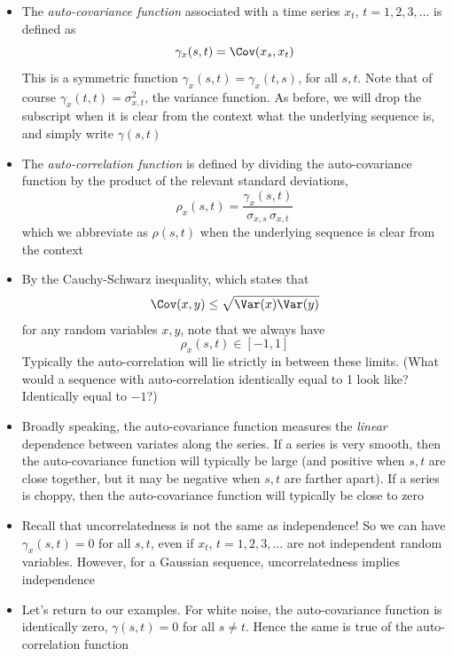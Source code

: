 \documentclass{article}
\begin{document}
\begin{itemize}
\item The \emph{auto-covariance function} associated with a time series $x_t$,
  $t = 1,2,3,\dots$ is defined as
  \[
  \gamma_x(s,t) = \Cov(x_s, x_t)
  \]
  This is a symmetric function $\gamma_x(s,t) = \gamma_x(t,s)$, for all $s,t$.
  Note that of course $\gamma_x(t,t) = \sigma^2_{x,t}$, the variance
  function. As before, we will drop the subscript when it is clear from the
  context what the underlying sequence is, and simply write $\gamma(s,t)$  

\item The \emph{auto-correlation function} is defined by dividing the
  auto-covariance function by the product of the relevant standard deviations, 
  \[
  \rho_x(s,t) = \frac{\gamma_x(s,t)}{\sigma_{x,s} \, \sigma_{x,t}}
  \]
  which we abbreviate as $\rho(s,t)$ when the underlying sequence is clear from
  the context 

\item By the Cauchy-Schwarz inequality, which states that
  \[
  \Cov(x, y) \leq \sqrt{\Var(x) \Var(y)}
  \]
  for any random variables $x,y$, note that we always have
  \[
  \rho_x(s,t) \in [-1, 1]
  \]
  Typically the auto-correlation will lie strictly in between these limits. 
  (What would a sequence with auto-correlation identically equal to 1 look like?  
  Identically equal to $-1$?) 

\item Broadly speaking, the auto-covariance function measures the \emph{linear}
  dependence between variates along the series. If a series is very smooth, then
  the auto-covariance function will typically be large (and positive when $s,t$
  are close together, but it may be negative when $s,t$ are farther apart). If a 
  series is choppy, then the auto-covariance function will typically be close to
  zero 

\item Recall that uncorrelatedness is not the same as independence! So we can
  have $\gamma_x(s,t) = 0$ for all $s,t$, even if $x_t$, $t = 1,2,3,\dots$ are
  not independent random variables. However, for a Gaussian sequence,
  uncorrelatedness implies independence

\item Let's return to our examples. For white noise, the auto-covariance
  function is identically zero, $\gamma(s,t) = 0$ for all $s \not= t$. Hence the
  same is true of the auto-correlation function


\end{itemize}
\end{document}
